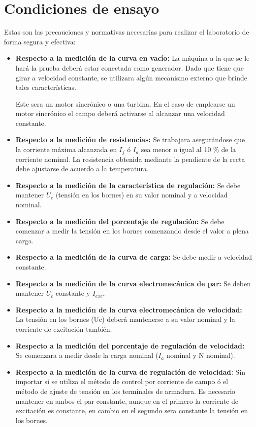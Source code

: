 \documentclass[11pt,letterpaper]{article}     %
\begin{document}
\section{Condiciones de ensayo}
Estas son las precauciones y normativas necesarias para realizar el laboratorio de forma segura y efectiva: 
\begin{itemize}
    \item \textbf{Respecto a la medición de la curva en vacío:} La máquina a la que se le hará la prueba deberá estar conectada como generador. Dado que tiene que girar a velocidad constante, se utilizara algún mecanismo externo que brinde tales características. 
    
    Este sera un motor sincrónico o una turbina. En el caso de emplearse un motor sincrónico el campo deberá activarse al alcanzar una velocidad constante.
    \item \textbf{Respecto a la medición de resistencias:} Se trabajara asegurándose que la corriente máxima alcanzada en $I_{f}$ ó $I_{a}$ sea menor o igual al 10 \% de la corriente nominal. La resistencia obtenida mediante la pendiente de la recta debe ajustarse de acuerdo a la temperatura.
    \item \textbf{Respecto a la medición de la característica de regulación:} Se debe mantener $U_{c}$ (tensión en los bornes) en su valor nominal y a velocidad nominal. 
    \item  \textbf{Respecto a la medición del porcentaje de regulación:} Se debe comenzar a medir la tensión en los bornes comenzando desde el valor a plena carga.
    \item \textbf{Respecto a la medición de la curva de carga:} Se debe medir a velocidad constante.
    \item \textbf{Respecto a la medición de la curva electromecánica de par:} Se deben mantener $U_{c}$ constante y $I_{exc}$.
    \item \textbf{Respecto a la medición de la curva electromecánica de velocidad:} La tensión en los bornes (Uc) deberá mantenerse a su valor nominal y la corriente de excitación también.
    \item  \textbf{Respecto a la medición del porcentaje de regulación de velocidad:} Se comenzara a medir desde la carga nominal ($I_{a}$ nominal y N nominal).
    \item  \textbf{Respecto a la medición de la curva de regulación de velocidad:} Sin importar si se utiliza el método de control por corriente de campo ó el método de ajuste de tensión en los terminales de armadura. Es necesario mantener en ambos el par constante, aunque en el primero la corriente de excitación es constante, en cambio en el segundo sera constante la tensión en los bornes.

\end{itemize}
\end{document}
